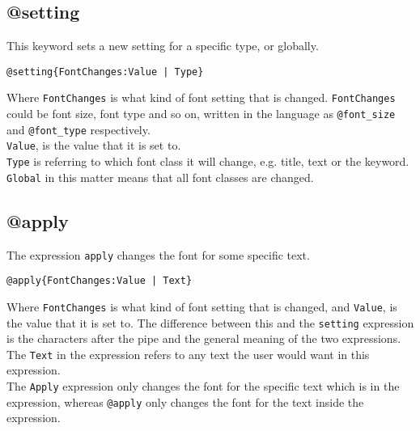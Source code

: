 \subsection{@setting}
This keyword sets a new setting for a specific type, or globally.
\begin{lstlisting}[frame=single]
@setting{FontChanges:Value | Type}
\end{lstlisting}
Where \texttt{FontChanges} is what kind of font setting that is changed. 
\texttt{FontChanges} could be font size, font type and so on, written in the language as \texttt{@font\_size} and \texttt{@font\_type} respectively. \\
\texttt{Value}, is the value that it is set to. \\
\texttt{Type} is referring to which font class it will change, e.g. title, text or the keyword. \\ %
\texttt{Global} in this matter means that all font classes are changed.

\subsection{@apply}
The expression \texttt{apply} changes the font for some specific text.
\begin{lstlisting}[frame=single]
@apply{FontChanges:Value | Text}
\end{lstlisting}
Where \texttt{FontChanges} is what kind of font setting that is changed, and \texttt{Value}, is the value that it is set to. The difference between this and the \texttt{setting} expression is the characters after the pipe and the general meaning of the two expressions. \\
The \texttt{Text} in the expression refers to any text the user would want in this expression. \\
The \texttt{Apply} expression only changes the font for the specific text which is in the expression, whereas \texttt{@apply} only changes the font for the text inside the expression.


